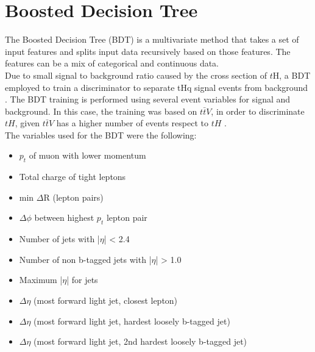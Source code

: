 \section{Boosted Decision Tree}
The Boosted Decision Tree (BDT) is a multivariate method that takes a set of input features and splits input data recursively based on
those features.  The features can be a mix of categorical and continuous data.
\\

Due to small signal to background ratio caused by the cross section of $t$H, a BDT  employed to train a discriminator to separate
tHq signal events from background . The BDT training is performed using several event variables for signal and background. In this case, the training was  based on $t\bar{t}V$, in order to discriminate $tH$, given  $t\bar{t}V$ has a higher number of events respect to $tH$ .\\
The variables used for the BDT were the following:

\begin{itemize}
	\item	$p_t$ of muon with lower momentum
	\item 	Total charge of tight leptons
	\item 	min $\Delta$R (lepton pairs)
	\item 	$\Delta\phi$ between highest $p_t$ lepton pair
	\item 	Number of jets with |$\eta$| < 2.4
	\item	Number of non b-tagged jets with |$\eta$| > 1.0
	\item	Maximum |$\eta$| for jets
	\item	$\Delta\eta$ (most forward light jet, closest lepton)
	\item	$\Delta\eta$ (most forward light jet, hardest loosely b-tagged jet)
	\item	$\Delta\eta$ (most forward light jet, 2nd hardest loosely b-tagged jet)
\end{itemize}









